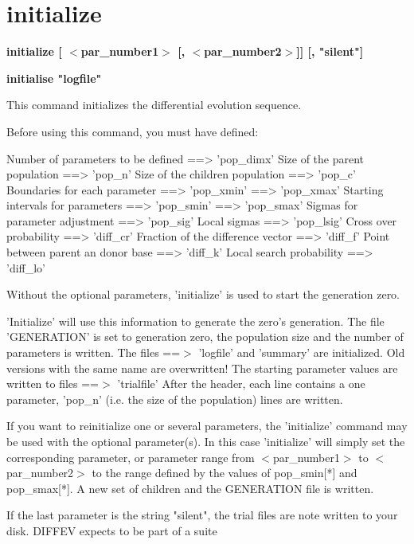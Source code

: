 \section{initialize}
{\bf initialize [ $ <$par\_number1$> $ [, $ <$par\_number2$> $]] [, "silent"] \par }
{\bf initialise "logfile" \par }
\par
\vspace{3pt}
This command initializes the differential evolution sequence. 
\par
Before using this command, you must have defined: 
\begin{MacVerbatim}
Number of parameters to be defined ==> 'pop_dimx'
Size of the parent population      ==> 'pop_n'
Size of the children population    ==> 'pop_c'
Boundaries for each parameter      ==> 'pop_xmin'
                                   ==> 'pop_xmax'
Starting intervals for parameters  ==> 'pop_smin'
                                   ==> 'pop_smax'
Sigmas for parameter adjustment    ==> 'pop_sig'
Local sigmas                       ==> 'pop_lsig'
Cross over probability             ==> 'diff_cr'
Fraction of the difference vector  ==> 'diff_f'
Point between parent an donor base ==> 'diff_k'
Local search probability           ==> 'diff_lo'
\end{MacVerbatim}
Without the optional parameters, 'initialize' is used to start 
the generation zero. 
\par
'Initialize' will use this information to generate the zero's generation. 
The file 'GENERATION' is set to generation zero, the population size 
and the number of parameters is written. 
The files ==$> $ 'logfile' and 'summary' are initialized. Old versions 
with the same name are overwritten! 
The starting parameter values are written to files ==$> $ 'trialfile' 
After the header, each line contains a one parameter, 
'pop\_n' (i.e. the size of the population) lines are written. 
\par
If you want to reinitialize one or several parameters, the 
'initialize' command may be used with the optional parameter(s). 
In this case 'initialize' will simply set the corresponding 
parameter, or parameter range from $ <$par\_number1$> $ to $ <$par\_number2$> $ 
to the range defined by the values of pop\_smin[*] and pop\_smax[*]. 
A new set of children and the GENERATION file is written. 
\par
If the last parameter is the string "silent", the trial files are 
note written to your disk. DIFFEV expects to be part of a suite 

